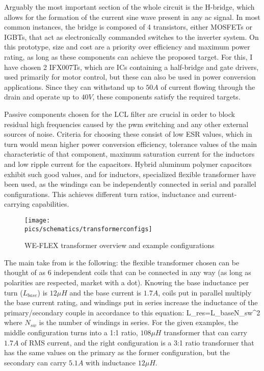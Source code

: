 Arguably the most important section of the whole circuit is the \gls{H-bridge}, which allows for the formation of the current sine wave present in any \gls{ac} signal.
In most common instances, the bridge is composed of 4 transistors, either MOSFETs or IGBTs, that act as electronically commanded switches to the inverter system. On this prototype, size and cost are a priority over efficiency and maximum power rating, as long as these components can achieve the proposed target.
For this, I have chosen 2 IFX007Ts, which are ICs containing a half-bridge and gate drivers, used primarily for motor control, but these can also be used in power conversion applications.
Since they can withstand up to $50A$ of current flowing through the drain and operate up to $40V$, these components satisfy the required targets.

Passive components chosen for the LCL filter are crucial in order to block residual high frequencies caused by the \gls{pwm} switching and any other external sources of noise.
Criteria for choosing these consist of low ESR values, which in turn would mean higher power conversion efficiency, tolerance values of the main characteristic of that component, maximum saturation current for the inductors and low ripple current for the capacitors.
Hybrid aluminum polymer capacitors exhibit such good values, and for inductors, specialized flexible transformer have been used, as the windings can be independently connected in serial and parallel configurations. This achieves different turn ratios, inductance and current-carrying capabilities.

\begin{figure}[!ht]
    \begin{center}\texttt{[image: \\pics/schematics/transformerconfigs]}\end{center}
    \caption{WE-FLEX transformer overview and example configurations}
    \label{fig:transf}
\end{figure}

The main take from  is the following: the flexible transformer chosen can be thought of as 6 independent coils that can be connected in any way (as long as polarities are respected, market with a dot).
Knowing the base inductance per turn ($L_{base}$) is $12\mu H$ and the base current is $1.7A$, coils put in parallel multiply the base current rating, and windings put in series increase the inductance of the primary/secondary couple in accordance to this equation:
\be
\label{eq:Lwindings}
L_{res}=L_{base}\times N_{sw}^2
\ee
where $N_{sw}$ is the number of windings in series.
For the given examples, the middle configuration turns into a 1:1 ratio, $108\mu H$ transformer that can carry $1.7A$ of RMS current, and the right configuration is a 3:1 ratio transformer that has the same values on the primary as the former configuration, but the secondary can carry $5.1A$ with inductance $12\mu H$.

